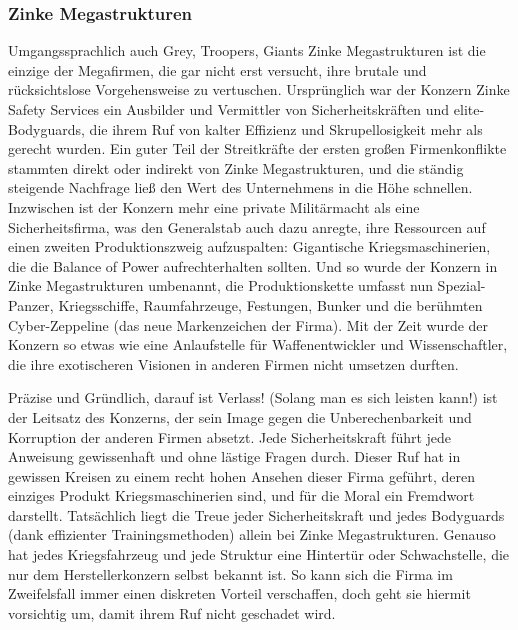 \subsubsection{Zinke Megastrukturen}
Umgangssprachlich auch \glqq Grey\grqq{}, \glqq Troopers\grqq{}, \glqq Giants\grqq{}
Zinke Megastrukturen ist die einzige der Megafirmen, die gar nicht erst versucht, ihre brutale und rücksichtslose Vorgehensweise zu vertuschen. Ursprünglich war der Konzern Zinke Safety Services ein Ausbilder und Vermittler von Sicherheitskräften und elite-Bodyguards, die ihrem Ruf von kalter Effizienz und Skrupellosigkeit mehr als gerecht wurden. Ein guter Teil der Streitkräfte der ersten großen Firmenkonflikte stammten direkt oder indirekt von Zinke Megastrukturen, und die ständig steigende Nachfrage ließ den Wert des Unternehmens in die Höhe schnellen. Inzwischen ist der Konzern mehr eine private Militärmacht als eine Sicherheitsfirma, was den Generalstab auch dazu anregte, ihre Ressourcen auf einen zweiten Produktionszweig aufzuspalten: Gigantische Kriegsmaschinerien, die die \glqq Balance of Power\grqq{} aufrechterhalten sollten. Und so wurde der Konzern in Zinke Megastrukturen umbenannt, die Produktionskette umfasst nun Spezial-Panzer, Kriegsschiffe, Raumfahrzeuge, Festungen, Bunker und die berühmten Cyber-Zeppeline (das neue Markenzeichen der Firma). Mit der Zeit wurde der Konzern so etwas wie eine Anlaufstelle für Waffenentwickler und Wissenschaftler, die ihre exotischeren Visionen in anderen Firmen nicht umsetzen durften.

\glqq Präzise und Gründlich, darauf ist Verlass!\grqq{} (Solang man es sich leisten kann!) ist der Leitsatz des Konzerns, der sein Image gegen die Unberechenbarkeit und Korruption der anderen Firmen absetzt. Jede Sicherheitskraft führt jede Anweisung gewissenhaft und ohne lästige Fragen durch. Dieser Ruf hat in gewissen Kreisen zu einem recht hohen Ansehen dieser Firma geführt, deren einziges Produkt Kriegsmaschinerien sind, und für die Moral ein Fremdwort darstellt. Tatsächlich liegt die Treue jeder Sicherheitskraft und jedes Bodyguards (dank effizienter \glqq Trainingsmethoden\grqq{}) allein bei Zinke Megastrukturen. Genauso hat jedes Kriegsfahrzeug und jede Struktur eine Hintertür oder Schwachstelle, die nur dem Herstellerkonzern selbst bekannt ist. So kann sich die Firma im Zweifelsfall immer einen diskreten Vorteil verschaffen, doch geht sie hiermit vorsichtig um, damit ihrem Ruf nicht geschadet wird.
